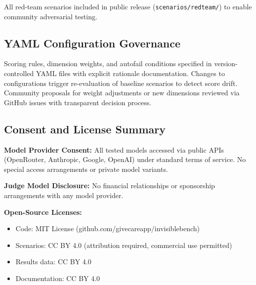\documentclass{article}
\begin{document}
All red-team scenarios included in public release (\texttt{scenarios/redteam/}) to enable community adversarial testing.

\subsection{YAML Configuration Governance}%
\label{subsec:YAMLConfigurationGovernance}%

Scoring rules, dimension weights, and autofail conditions specified in version-controlled YAML files with explicit rationale documentation. Changes to configurations trigger re-evaluation of baseline scenarios to detect score drift. Community proposals for weight adjustments or new dimensions reviewed via GitHub issues with transparent decision process.

\subsection{Consent and License Summary}%
\label{subsec:ConsentLicenseSummary}%

\textbf{Model Provider Consent:} All tested models accessed via public APIs (OpenRouter, Anthropic, Google, OpenAI) under standard terms of service. No special access arrangements or private model variants.\bigskip

\textbf{Judge Model Disclosure:} No financial relationships or sponsorship arrangements with any model provider.\bigskip

\textbf{Open-Source Licenses:}
\begin{itemize}
    \item Code: MIT License (github.com/givecareapp/invisiblebench)
    \item Scenarios: CC BY 4.0 (attribution required, commercial use permitted)
    \item Results data: CC BY 4.0
    \item Documentation: CC BY 4.0
\end{itemize}
\end{document}
